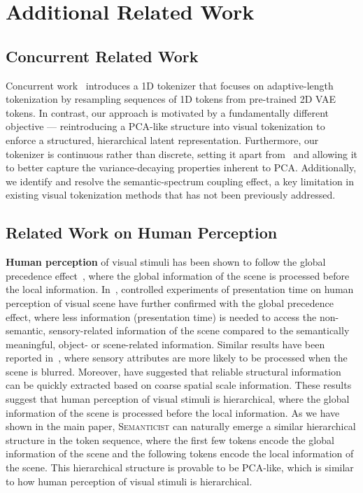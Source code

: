 \documentclass[10pt,twocolumn,letterpaper]{article}
\DeclareRobustCommand{\modelname}{\textsc{Semanticist}\xspace}
\begin{document}
\section{Additional Related Work}

\subsection{Concurrent Related Work}

Concurrent work~\cite{bachmann2025flextok} introduces a 1D tokenizer that focuses on adaptive-length tokenization by resampling sequences of 1D tokens from pre-trained 2D VAE tokens. 
In contrast, our approach is motivated by a fundamentally different objective --- reintroducing a PCA-like structure into visual tokenization to enforce a structured, hierarchical latent representation. 
Furthermore, our tokenizer is continuous rather than discrete, setting it apart from~\cite{bachmann2025flextok} and allowing it to better capture the variance-decaying properties inherent to PCA. 
Additionally, we identify and resolve the semantic-spectrum coupling effect, a key limitation in existing visual tokenization methods that has not been previously addressed.


\subsection{Related Work on Human Perception}


\textbf{Human perception} of visual stimuli has been shown to follow the global precedence effect~\cite{NAVON1977353}, where the global information of the scene is processed before the local information.
In~\cite{fei2007we}, controlled experiments of presentation time on human perception of visual scene have further confirmed with the global precedence effect, where less information (presentation time) is needed to access the non-semantic, sensory-related information of the scene compared to the semantically meaningful, object- or scene-related information.
Similar results have been reported in~\cite{inference}, where sensory attributes are more likely to be processed when the scene is blurred.
Moreover, \cite{OLIVA2000176} have suggested that reliable structural information can be quickly extracted based on coarse spatial scale information.
These results suggest that human perception of visual stimuli is hierarchical, where the global information of the scene is processed before the local information.
As we have shown in the main paper, \modelname can naturally emerge a similar hierarchical structure in the token sequence, where the first few tokens encode the global information of the scene and the following tokens encode the local information of the scene.
This hierarchical structure is provable to be PCA-like, which is similar to how human perception of visual stimuli is hierarchical.
\end{document}
